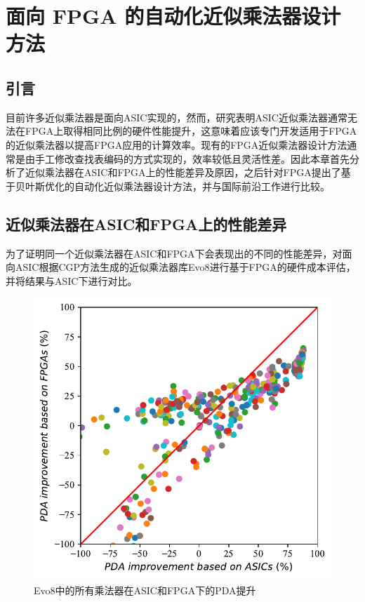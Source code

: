 \chapter{面向 FPGA 的自动化近似乘法器设计方法}

\section{引言}

目前许多近似乘法器是面向ASIC实现的，然而，研究表明ASIC近似乘法器通常无法在FPGA上取得相同比例的硬件性能提升\cite{AC:AM:FPGA:SMApproxLib}，这意味着应该专门开发适用于FPGA的近似乘法器以提高FPGA应用的计算效率。现有的FPGA近似乘法器设计方法通常是由手工修改查找表编码的方式实现的，效率较低且灵活性差。因此本章首先分析了近似乘法器在ASIC和FPGA上的性能差异及原因，之后针对FPGA提出了基于贝叶斯优化的自动化近似乘法器设计方法，并与国际前沿工作进行比较。


\section{近似乘法器在ASIC和FPGA上的性能差异}

为了证明同一个近似乘法器在ASIC和FPGA下会表现出的不同的性能差异，对面向ASIC根据CGP方法生成的近似乘法器库Evo8\cite{AC:AM:CGP_Evoapprox8b}进行基于FPGA的硬件成本评估，并将结果与ASIC下进行对比。

\begin{figure}[!ht]
    \centering
    \includegraphics[width=0.7\linewidth]{./figs/AC-AM-AMG-Evo8_ASIC_FPGA.pdf}
    \caption{Evo8中的所有乘法器在ASIC和FPGA下的PDA提升}
    \label{AC:AM:AMG:Fig:Evo8_ASIC_FPGA.pdf}
\end{figure}

